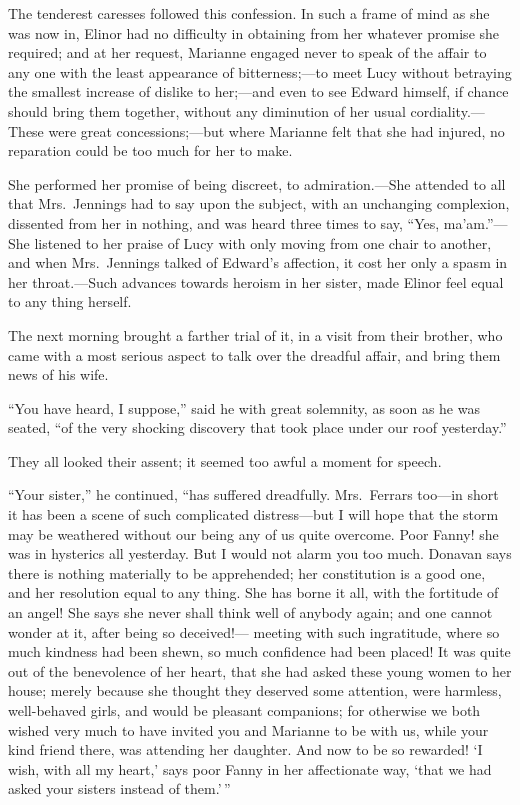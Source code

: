 The tenderest caresses followed this confession.
In such a frame of mind as she was now in, Elinor had
no difficulty in obtaining from her whatever promise
she required; and at her request, Marianne engaged
never to speak of the affair to any one with the least
appearance of bitterness;---to meet Lucy without betraying
the smallest increase of dislike to her;---and even to see
Edward himself, if chance should bring them together,
without any diminution of her usual cordiality.---%
These were great concessions;---but where Marianne felt
that she had injured, no reparation could be too much
for her to make.

She performed her promise of being discreet,
to admiration.---She attended to all that Mrs.\ Jennings
had to say upon the subject, with an unchanging complexion,
dissented from her in nothing, and was heard three
times to say, ``Yes, ma'am.''---She listened to her praise
of Lucy with only moving from one chair to another,
and when Mrs.\ Jennings talked of Edward's affection,
it cost her only a spasm in her throat.---Such advances
towards heroism in her sister, made Elinor feel equal
to any thing herself.

The next morning brought a farther trial of it,
in a visit from their brother, who came with a most serious
aspect to talk over the dreadful affair, and bring them
news of his wife.

``You have heard, I suppose,'' said he with great solemnity,
as soon as he was seated, ``of the very shocking discovery
that took place under our roof yesterday.''

They all looked their assent; it seemed too awful
a moment for speech.

``Your sister,'' he continued, ``has suffered dreadfully.
Mrs.\ Ferrars too---in short it has been a scene of such
complicated distress---but I will hope that the storm may
be weathered without our being any of us quite overcome.
Poor Fanny! she was in hysterics all yesterday.
But I would not alarm you too much.  Donavan says there
is nothing materially to be apprehended; her constitution
is a good one, and her resolution equal to any thing.
She has borne it all, with the fortitude of an angel!
She says she never shall think well of anybody again;
and one cannot wonder at it, after being so deceived!---%
meeting with such ingratitude, where so much kindness
had been shewn, so much confidence had been placed!  It
was quite out of the benevolence of her heart, that she
had asked these young women to her house; merely because
she thought they deserved some attention, were harmless,
well-behaved girls, and would be pleasant companions;
for otherwise we both wished very much to have invited you
and Marianne to be with us, while your kind friend there,
was attending her daughter.  And now to be so rewarded!
`I wish, with all my heart,' says poor Fanny in her
affectionate way, `that we had asked your sisters instead
of them.'\,''

